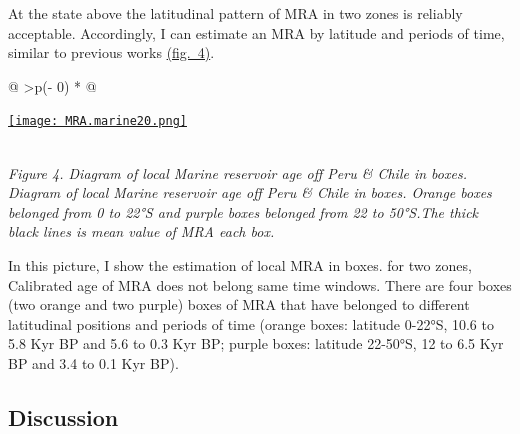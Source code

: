 \documentclass[
]{article}
\begin{document}
At the state above the latitudinal pattern of MRA in two zones is
reliably acceptable. Accordingly, I can estimate an MRA by latitude and
periods of time, similar to previous works
\protect\hyperlink{mra-estimated-under-marine20}{(fig.~4)}.

\begin{longtable}[]{@{}
  >{\centering\arraybackslash}p{(\columnwidth - 0\tabcolsep) * }@{}}
\toprule
\begin{minipage}[b]{\linewidth}\centering
\href{https://github.com/jasb3110/Radiocarbon-reservoir/blob/db842ff0620d55ea5ca5ceec0d96a369406b6e3c/MRA.marine20.png?raw=true}{\texttt{[image: MRA.marine20.png]}}
\end{minipage} \\
\midrule
\endhead
\emph{Figure 4. Diagram of local Marine reservoir age off Peru \& Chile
in boxes. Diagram of local Marine reservoir age off Peru \& Chile in
boxes. Orange boxes belonged from 0 to 22°S and purple boxes belonged
from 22 to 50°S.The thick black lines is mean value of MRA each box.} \\
\bottomrule
\end{longtable}

In this picture, I show the estimation of local MRA in boxes. for two
zones, Calibrated age of MRA does not belong same time windows. There
are four boxes (two orange and two purple) boxes of MRA that have
belonged to different latitudinal positions and periods of time (orange
boxes: latitude 0-22°S, 10.6 to 5.8 Kyr BP and 5.6 to 0.3 Kyr BP; purple
boxes: latitude 22-50°S, 12 to 6.5 Kyr BP and 3.4 to 0.1 Kyr BP).

\hypertarget{discussion}{%
\subsection{Discussion}\label{discussion}}
\end{document}
